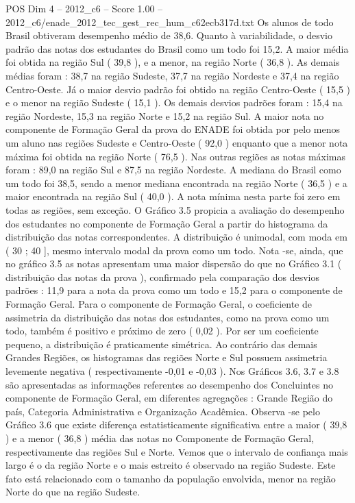 \begin{textsample}{POS Dim 4 – 2012\_c6 – Score 1.00 – 2012\_c6/enade\_2012\_tec\_gest\_rec\_hum\_c62ecb317d.txt}
Os alunos de todo Brasil obtiveram desempenho médio de 38,6.
Quanto à variabilidade, o desvio padrão das notas dos estudantes do Brasil como um todo foi 15,2.
A maior média foi obtida na região Sul ( 39,8 ), e a menor, na região Norte ( 36,8 ).
As demais médias foram : 38,7 na região Sudeste, 37,7 na região Nordeste e 37,4 na região Centro-Oeste.
Já o maior desvio padrão foi obtido na região Centro-Oeste ( 15,5 ) e o menor na região Sudeste ( 15,1 ).
Os demais desvios padrões foram : 15,4 na região Nordeste, 15,3 na região Norte e 15,2 na região Sul.
A maior nota no componente de Formação Geral da prova do ENADE foi obtida por pelo menos um aluno nas regiões Sudeste e Centro-Oeste ( 92,0 ) enquanto que a menor nota máxima foi obtida na região Norte ( 76,5 ).
Nas outras regiões as notas máximas foram : 89,0 na região Sul e 87,5 na região Nordeste.
A mediana do Brasil como um todo foi 38,5, sendo a menor mediana encontrada na região Norte ( 36,5 ) e a maior encontrada na região Sul ( 40,0 ).
A nota mínima nesta parte foi zero em todas as regiões, sem exceção.
O Gráfico 3.5 propicia a avaliação do desempenho dos estudantes no componente de Formação Geral a partir do histograma da distribuição das notas correspondentes.
A distribuição é unimodal, com moda em ( 30 ; 40 ], mesmo intervalo modal da prova como um todo.
Nota -se, ainda, que no gráfico 3.5 as notas apresentam uma maior dispersão do que no Gráfico 3.1 ( distribuição das notas da prova ), confirmado pela comparação dos desvios padrões : 11,9 para a nota da prova como um todo e 15,2 para o componente de Formação Geral.
Para o componente de Formação Geral, o coeficiente de assimetria da distribuição das notas dos estudantes, como na prova como um todo, também é positivo e próximo de zero ( 0,02 ).
Por ser um coeficiente pequeno, a distribuição é praticamente simétrica.
Ao contrário das demais Grandes Regiões, os histogramas das regiões Norte e Sul possuem assimetria levemente negativa ( respectivamente -0,01 e -0,03 ).
Nos Gráficos 3.6, 3.7 e 3.8 são apresentadas as informações referentes ao desempenho dos Concluintes no componente de Formação Geral, em diferentes agregações : Grande Região do país, Categoria Administrativa e Organização Acadêmica.
Observa -se pelo Gráfico 3.6 que existe diferença estatisticamente significativa entre a maior ( 39,8 ) e a menor ( 36,8 ) média das notas no Componente de Formação Geral, respectivamente das regiões Sul e Norte.
Vemos que o intervalo de confiança mais largo é o da região Norte e o mais estreito é observado na região Sudeste.
Este fato está relacionado com o tamanho da população envolvida, menor na região Norte do que na região Sudeste.

\end{textsample}
